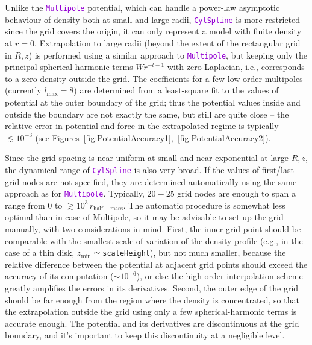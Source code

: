 \documentclass[12pt]{article}
\newcommand{\ttt}[1]{\textcolor{darkviolet}{\texttt{#1}}}
\begin{document}
Unlike the \ttt{Multipole} potential, which can handle a power-law asymptotic behaviour of density both at small and large radii, \ttt{CylSpline} is more restricted -- since the grid covers the origin, it can only represent a model with finite density at $r=0$. Extrapolation to large radii (beyond the extent of the rectangular grid in $R,z$) is performed using a similar approach to \ttt{Multipole}, but keeping only the principal spherical-harmonic terms $W r^{-l-1}$ with zero Laplacian, i.e., corresponds to a zero density outside the grid. The coefficients for a few low-order multipoles (currently $l_\mathrm{max}=8$) are determined from a least-square fit to the values of potential at the outer boundary of the grid; thus the potential values inside and outside the boundary are not exactly the same, but still are quite close -- the relative error in potential and force in the extrapolated regime is typically $\lesssim 10^{-3}$ (see Figures~\ref{fig:PotentialAccuracy1},~\ref{fig:PotentialAccuracy2}).

Since the grid spacing is near-uniform at small and near-exponential at large $R,z$, the dynamical range of \ttt{CylSpline} is also very broad. If the values of first/last grid nodes are not specified, they are determined automatically using the same approach as for \ttt{Multipole}. Typically, $20-25$ grid nodes are enough to span a range from 0 to $\gtrsim 10^3\,r_\mathrm{half-mass}$.
The automatic procedure is somewhat less optimal than in case of Multipole, so it may be advisable to set up the grid manually, with two considerations in mind. First, the inner grid point should be comparable with the smallest scale of variation of the density profile (e.g., in the case of a thin disk, $z_\mathrm{min} \simeq{}$\texttt{scaleHeight}), but not much smaller, because the relative difference between the potential at adjacent grid points should exceed the accuracy of its computation ($\sim10^{-6}$), or else the high-order interpolation scheme greatly amplifies the errors in its derivatives. Second, the outer edge of the grid should be far enough from the region where the density is concentrated, so that the extrapolation outside the grid using only a few spherical-harmonic terms is accurate enough. The potential and its derivatives are discontinuous at the grid boundary, and it's important to keep this discontinuity at a negligible level.
\end{document}

